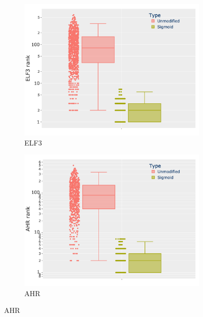 \begin{figure}[H]
    \centering
    \begin{subfigure}{0.49\linewidth}
        \includegraphics[width=1.0\textwidth,height=1.0\textheight,keepaspectratio]{Sections/Network_II/resources/reward/corr_analysis/ELF3_box.png}
        \caption{ELF3}
        \label{fig:N_II:ahr_corr}
    \end{subfigure}
    \centering
    \begin{subfigure}{0.49\linewidth}
        \includegraphics[width=1.0\textwidth,height=1.0\textheight,keepaspectratio]{Sections/Network_II/resources/reward/corr_analysis/AHR_box.png}
        \caption{AHR}
        \label{fig:N_II:elf3_corr}
    \end{subfigure} %

\end{figure}
